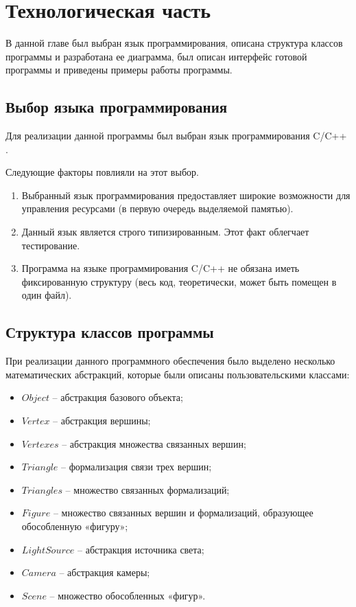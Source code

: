 \chapter{Технологическая часть}

В данной главе был выбран язык программирования, описана структура классов программы и разработана ее диаграмма, был описан интерфейс готовой программы и приведены примеры работы программы.

\section{Выбор языка программирования}

Для реализации данной программы был выбран язык программирования  C/C++ \cite{Cpp}. 

Следующие факторы повлияли на этот выбор.

\begin{enumerate}
	\item Выбранный язык программирования предоставляет широкие возможности для управления ресурсами (в первую очередь выделяемой памятью).
	\item Данный язык является строго типизированным. Этот факт облегчает тестирование.
	\item Программа на языке программирования C/C++ не обязана иметь фиксированную структуру (весь код, теоретически, может быть помещен в один файл).
\end{enumerate}

\section{Структура классов программы}

При реализации данного программного обеспечения было выделено несколько математических абстракций, которые были описаны пользовательскими классами:

\begin{itemize}
	\item $Object$ – абстракция базового объекта; 
	\item $Vertex$ – абстракция вершины;
	\item $Vertexes$ – абстракция множества связанных вершин;
	\item $Triangle$ – формализация связи трех вершин;
	\item $Triangles$ – множество связанных формализаций;
	\item $Figure$ – множество связанных вершин и формализаций, образующее обособленную «фигуру»;
	\item $LightSource$ – абстракция источника света;
	\item $Camera$ – абстракция камеры;
	\item $Scene$ – множество обособленных «фигур».
\end{itemize}

